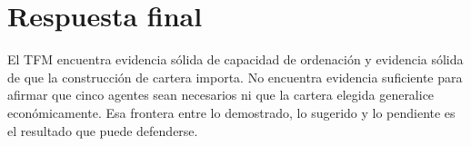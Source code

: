\section*{Respuesta final}

El TFM encuentra evidencia sólida de capacidad de ordenación y evidencia sólida de que la
construcción de cartera importa. No encuentra evidencia suficiente para afirmar que cinco agentes
sean necesarios ni que la cartera elegida generalice económicamente. Esa frontera entre lo
demostrado, lo sugerido y lo pendiente es el resultado que puede defenderse.
